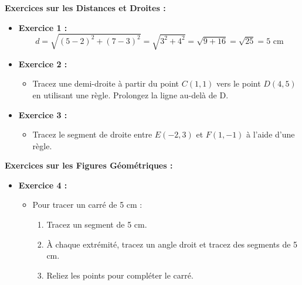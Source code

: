 \documentclass{article}
\begin{document}
\begin{tcolorbox}[colback=green!10!white, colframe=green!75!black, title=\textcolor{white}{Corrections }, sharp corners=south]

    \vspace{2pt}

    \textbf{Exercices sur les Distances et Droites :}

    \begin{itemize}
        \item \textbf{Exercice 1 :} 
            \[
            d = \sqrt{(5 - 2)^2 + (7 - 3)^2} = \sqrt{3^2 + 4^2} = \sqrt{9 + 16} = \sqrt{25} = 5 \text{ cm}
            \]

        \item \textbf{Exercice 2 :} 
            \begin{itemize}
                \item Tracez une demi-droite à partir du point \(C(1, 1)\) vers le point \(D(4, 5)\) en utilisant une règle. Prolongez la ligne au-delà de D.
            \end{itemize}

        \item \textbf{Exercice 3 :} 
            \begin{itemize}
                \item Tracez le segment de droite entre \(E(-2, 3)\) et \(F(1, -1)\) à l'aide d'une règle.
            \end{itemize}
    \end{itemize}

    \vspace{4pt}

    \textbf{Exercices sur les Figures Géométriques :}

    \begin{itemize}
        \item \textbf{Exercice 4 :} 
            \begin{itemize}
                \item Pour tracer un carré de 5 cm : 
                    \begin{enumerate}
                        \item Tracez un segment de 5 cm.
                        \item À chaque extrémité, tracez un angle droit et tracez des segments de 5 cm.
                        \item Reliez les points pour compléter le carré.
                    \end{enumerate}
            \end{itemize}


\end{itemize}
\end{tcolorbox}
\end{document}
